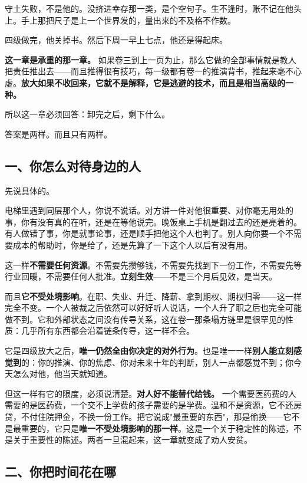 \documentclass[11pt,a4paper]{ctexart}
\begin{document}
守土失败，不是他的。没挤进幸存那一类，是个空句子。生不逢时，账不记在他头上。手上那把尺子是上一个世界发的，量出来的不及格不作数。

四级做完，他关掉书。然后下周一早上七点，他还是得起床。

\textbf{这一章是承重的那一章。} 如果卷三到上一页为止，那么它做的全部事情就是教人把责任推出去——而且推得很有技巧，每一级都有卷一的推演背书，推起来毫不心虚。\textbf{放大如果不收回来，它就不是解释，它是逃避的技术，而且是相当高级的一种。}

所以这一章必须回答：卸完之后，剩下什么。

答案是两样。而且只有两样。

\subsection{一、你怎么对待身边的人}

先说具体的。

电梯里遇到同层那个人，你说不说话。对方讲一件对他很重要、对你毫无用处的事，你有没有真的在听，还是在等他说完。晚饭桌上手机是翻过去的还是亮着的。有人做错了事，你是就事论事，还是顺手把他这个人也判了。别人向你要一个不需要成本的帮助时，你是给了，还是先算了一下这个人以后有没有用。

这一样\textbf{不需要任何资源}。不需要先攒够钱，不需要先找到下一份工作，不需要先等行业回暖，不需要任何人批准。\textbf{立刻生效}——不是三个月后见效，是当天。

而且\textbf{它不受处境影响}。在职、失业、升迁、降薪、拿到期权、期权归零——这一样完全不变。一个人被裁之后依然可以好好听人说话，一个人升了职之后也完全可能做不到。它和外部状态之间没有传导关系，这在卷一那条塌方链里是很罕见的性质：几乎所有东西都会沿着链条传导，这一样不会。

它是四级放大之后，\textbf{唯一仍然全由你决定的对外行为}。也是唯一一样\textbf{别人能立刻感觉到}的：你的推演、你的焦虑、你对未来十年的判断，别人一点都感觉不到；你今天怎么对他，他当天就知道。

但这一样有它的限度，必须说清楚。\textbf{对人好不能替代给钱。} 一个需要医药费的人需要的是医药费，一个交不上学费的孩子需要的是学费。温和不是资源，它不还房贷，不付住院押金，不换一份工作。把它说成"最重要的东西"，那是偷换——它不是最重要的，它只是\textbf{唯一不受处境影响的那一样}。这是一个关于稳定性的陈述，不是关于重要性的陈述。两者一旦混起来，这一章就变成了劝人安贫。

\subsection{二、你把时间花在哪}
\end{document}
